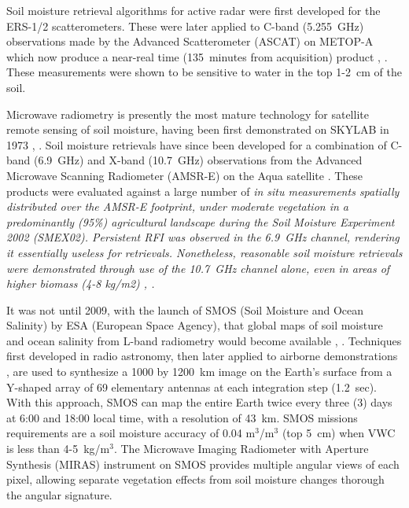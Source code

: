 \documentclass[draftcls,onecolumn]{IEEEtran}  %
\begin{document}


Soil moisture retrieval algorithms for active radar were first developed for the ERS-1/2 scatterometers.
These were later applied to C-band (5.255~GHz) observations made by the Advanced Scatterometer (ASCAT) on METOP-A which now produce a near-real time (135~minutes from acquisition) product \cite{Bartalis2007}, \cite{Wagner2013}.
These measurements were shown to be sensitive to water in the top 1-2~cm of the soil. 


Microwave radiometry is presently the most mature technology for satellite remote sensing of soil moisture, having been first demonstrated on SKYLAB in 1973   \cite{Murphy1987}, \cite{Schmugge1976}. 
Soil moisture retrievals have since been  developed for a combination of C-band (6.9~GHz) and X-band (10.7~GHz) observations from 
the Advanced Microwave Scanning Radiometer (AMSR-E) on the Aqua satellite  \cite{NjokuEG;JacksonTJ;LakshmiV;ChanTK;Nghiem2003}. 
These products were evaluated against a large number of \it in situ \rm measurements spatially distributed over the AMSR-E footprint, under moderate vegetation in a predominantly (95\%) agricultural landscape during the Soil Moisture Experiment 2002 (SMEX02).
Persistent RFI was observed in the 6.9~GHz channel, rendering it essentially useless for retrievals. 
Nonetheless, reasonable soil moisture retrievals were demonstrated through use of the 10.7~GHz channel alone, even in areas of higher biomass (4-8 kg/m2)
\cite{McCabe2005}, \cite{Bindlish2006a}.  


It was not until 2009, with the launch of SMOS (Soil Moisture and Ocean Salinity) by ESA (European Space Agency), that 
global maps of soil moisture and ocean salinity from L-band radiometry would become available \cite{Barre2008}, \cite{Kerr2007a}.  
Techniques first developed in radio astronomy, then later applied to airborne demonstrations \cite{LeVine1994},  
are used to synthesize a 1000 by 1200~km image on the Earth's surface from a Y-shaped array of 69 elementary antennas at each integration step (1.2~sec). 
With this approach, SMOS can map the entire Earth twice every three (3) days at 6:00 and 18:00 local time, with a resolution of 43~km.
SMOS missions requirements are a  soil moisture accuracy of 0.04 m$^3$/m$^3$ (top 5~cm) when VWC is less than 4-5~kg/m$^3$.
The Microwave Imaging Radiometer with Aperture Synthesis (MIRAS) instrument on SMOS  provides multiple angular views of each pixel, allowing 
separate vegetation effects from soil moisture changes thorough the angular signature. 
\end{document}
